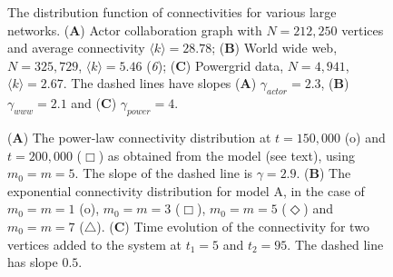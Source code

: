 \begin{figure}[ht]
\hspace{1in}
\vspace{-2in}
\caption{The distribution function of connectivities for various large networks. ({\bf A}) Actor collaboration graph with $N=212,250$ vertices and average connectivity $\langle k\rangle =28.78$; ({\bf B}) World wide web, $N=325,729$, $\langle k\rangle=5.46$ ({\it 6}); ({\bf C}) Powergrid data, $N=4,941$, $\langle k \rangle=2.67$. The dashed lines have slopes ({\bf A}) $\gamma_{actor}=2.3$, ({\bf B}) $\gamma_{www}=2.1$ and ({\bf C}) $\gamma_{power}=4$.}
\end{figure}

\begin{figure}[ht]
\hspace{1in}
\vspace{-2in}
\caption{({\bf A}) The power-law connectivity distribution at $t=150,000$ (o) and $t=200,000$ ($\Box$) as obtained from the model (see text), using $m_0=m=5$. The slope of the dashed line is $\gamma=2.9$. ({\bf B}) The exponential connectivity distribution for model A, in the case of $m_0=m=1$ (o), $m_0=m=3$ ($\Box$), $m_0=m=5$ ($\Diamond$) and $m_0=m=7$ ($\triangle$). ({\bf C}) Time evolution of the connectivity for two vertices added to the system at $t_1=5$ and $t_2=95$. The dashed line has slope $0.5$.}
\end{figure}


